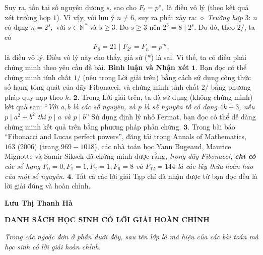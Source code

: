 \begin{multicols}{2}
	Suy ra, tồn tại số nguyên dương $s$, sao cho ${F_t} = {p^s},$ là điều vô lý (theo kết quả xét trường hợp $1$). Vì vậy, với lưu ý $n \ne 6$, suy ra phải xảy ra:
	\vskip 0.05cm
	$\diamond$ \textit{Trường hợp} $3$: $n$ có dạng $n = {2^s},$ với $s \in \mathbb{N^*}$ và $s \ge 3$.
	\vskip 0.05cm
	Do $s \ge 3$ nên  ${2^3} = 8\mid{2^s}$. Do đó, theo $2/$, ta có
	\begin{align*}
		{F_8} = 21\mid{F_{{2^s}}} = {F_n} = {p^m},
	\end{align*}
	là điều vô lý. Điều vô lý này cho thấy, giả sử ($*$) là sai. Vì thế, ta có điều phải chứng minh theo yêu cầu đề bài.
	\vskip 0.05cm
	\textbf{\color{thachthuctoanhoc}Bình luận và Nhận xét}
	\vskip 0.05cm
	$\pmb{1.}$ Bạn đọc có thể chứng minh tính chất $1/$ (nêu trong Lời giải trên) bằng cách sử dụng công thức số hạng tổng quát của dãy Fibonacci, và chứng minh tính chất $2/$ bằng phương pháp quy nạp theo $k$.
	\vskip 0.05cm
	$\pmb{2.}$ Trong Lời giải trên, ta đã sử dụng (không chứng minh) kết quả sau:
	\vskip 0.05cm
	“\textit{Với $a, b$ là các số nguyên, và $p$ là số nguyên tố có dạng $4k + 3$, nếu $p\mid{a^2} + {b^2}$  thì  $p \mid a$ và  $p \mid b$}”
	\vskip 0.05cm
	Sử dụng định lý nhỏ Fermat, bạn đọc có thể dễ dàng chứng minh kết quả trên bằng phương pháp phản chứng.
	\vskip 0.05cm
	$\pmb{3.}$ Trong bài báo “Fibonacci and Lucas perfect powers”, đăng tải trong Annals of Mathematics, $163$ ($2006$) (trang $969 - 1018$), các nhà toán học Yann Bugeaud, Maurice Mignotte và Samir Siksek đã chứng minh được rằng, \textit{trong dãy Fibonacci, \textbf{\color{thachthuctoanhoc}chỉ có} các số hạng $F_0=0, F_1 = 1, F_2 = 1, F_6 = 8$ và $F_{12} = 144$ là các lũy thừa hoàn hảo của một số nguyên.}
	\vskip 0.05cm
	$\pmb{4.}$ Tất cả các lời giải Tạp chí đã nhận được từ bạn đọc đều là lời giải đúng và hoàn chỉnh.
	\begin{flushright}
		\textbf{\color{thachthuctoanhoc}Lưu Thị Thanh Hà}
	\end{flushright}
\end{multicols}
\centerline{\textbf{\color{thachthuctoanhoc}DANH SÁCH HỌC SINH CÓ LỜI GIẢI HOÀN CHỈNH}}
\vskip 0.1cm
\textit{Trong các ngoặc đơn ở phần dưới đây, sau tên lớp là mã hiệu của các bài toán mà học sinh có lời giải hoàn chỉnh.}
